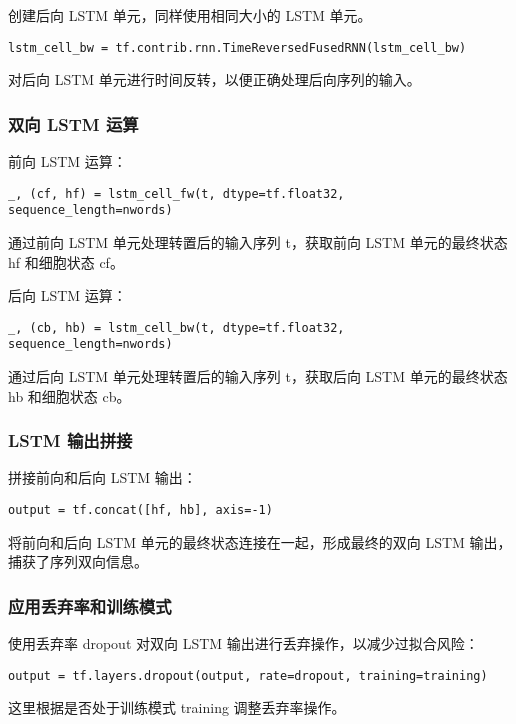 创建后向 LSTM 单元，同样使用相同大小的 LSTM 单元。

\begin{lstlisting}
lstm_cell_bw = tf.contrib.rnn.TimeReversedFusedRNN(lstm_cell_bw)\end{lstlisting}

对后向 LSTM 单元进行时间反转，以便正确处理后向序列的输入。


\subsubsection{双向 LSTM 运算}

前向 LSTM 运算：

\begin{lstlisting}
_, (cf, hf) = lstm_cell_fw(t, dtype=tf.float32, sequence_length=nwords)\end{lstlisting}

通过前向 LSTM 单元处理转置后的输入序列 t，获取前向 LSTM 单元的最终状态 hf 和细胞状态 cf。

后向 LSTM 运算：

\begin{lstlisting}
_, (cb, hb) = lstm_cell_bw(t, dtype=tf.float32, sequence_length=nwords)\end{lstlisting}

通过后向 LSTM 单元处理转置后的输入序列 t，获取后向 LSTM 单元的最终状态 hb 和细胞状态 cb。

\subsubsection{LSTM 输出拼接}

拼接前向和后向 LSTM 输出：

\begin{lstlisting}
output = tf.concat([hf, hb], axis=-1)\end{lstlisting}

将前向和后向 LSTM 单元的最终状态连接在一起，形成最终的双向 LSTM 输出，捕获了序列双向信息。


\subsubsection{应用丢弃率和训练模式}

使用丢弃率 dropout 对双向 LSTM 输出进行丢弃操作，以减少过拟合风险：

\begin{lstlisting}
output = tf.layers.dropout(output, rate=dropout, training=training)\end{lstlisting}

这里根据是否处于训练模式 training 调整丢弃率操作。